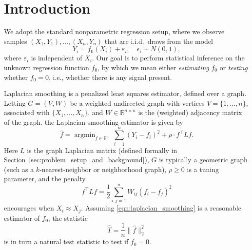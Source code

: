 \documentclass[twoside]{article}
\newcommand{\Reals}{\mathbb{R}}
\newcommand{\1}{\mathbf{1}}
\DeclareMathOperator*{\argmin}{argmin}
\newcommand{\Lap}{L}
\newcommand{\wh}[1]{\widehat{#1}}
\theoremstyle{definition}
\theoremstyle{remark}
\begin{document}
\section{Introduction}

We adopt the standard nonparametric regression setup, where we observe samples $(X_1,Y_1),\ldots,(X_n,Y_n)$ that are i.i.d.\ draws from the model 
\begin{equation}
\label{eqn:signal_plus_noise_model}
Y_i = f_0(X_i) + \varepsilon_i, \quad \epsilon_i \sim N(0,1), 
\end{equation}
where $\varepsilon_i$ is independent of $X_i$. Our goal is to perform statistical inference on the unknown regression function $f_0$, by which we mean either \emph{estimating} $f_0$ or \emph{testing} whether $f_0 = 0$, i.e., whether there is any signal present. 

Laplacian smoothing \citep{smola2003} is a penalized least squares estimator, defined over a graph. Letting $G = (V,W)$ be a weighted undirected graph with vertices $V=\{1,\ldots,n\}$, associated with $\{X_1,\ldots,X_n\}$, and $W \in \mathbb{R}^{n \times n}$ is the (weighted) adjacency matrix of the graph. 
the Laplacian smoothing estimator \smash{$\wh{f}$} is given by
\begin{equation}
\label{eqn:laplacian_smoothing}
\wh{f} =  \argmin_{f \in \Reals^n} \; \sum_{i = 1}^{n}(Y_i - f_i)^2 + \rho \cdot f^\top \Lap f. 
\end{equation}
Here $\Lap$ is the graph Laplacian matrix (defined formally in Section~\ref{sec:problem_setup_and_background}), $G$ is typically a geometric graph (such as a $k$-nearest-neighbor or neighborhood graph), $\rho \geq 0$ is a tuning parameter, and the penalty
\begin{equation*}
f^\top \Lap f = \frac{1}{2} \sum_{i,j = 1}^{n} W_{ij}(f_i - f_j)^2
\end{equation*}
encourages \smash{$\wh{f}_i \approx \wh{f}_j$} when $X_i \approx X_j$. Assuming \eqref{eqn:laplacian_smoothing} is a reasonable estimator of $f_0$, the statistic
\begin{equation}
\label{eqn:laplacian_smoothing_test}
\wh{T} = \frac{1}{n} \| \wh{f} \|_2^2 
\end{equation}
is in turn a natural test statistic to test if $f_0 = 0$. 
\end{document}
